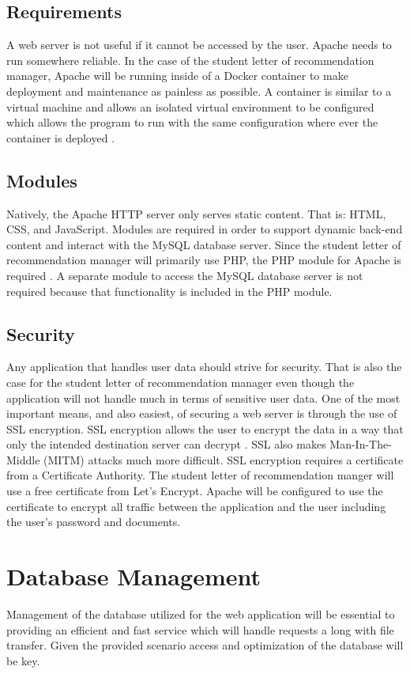 \documentclass[onecolumn, draftclsnofoot,10pt, compsoc]{IEEEtran}
\begin{document}
\subsection{Requirements}
A web server is not useful if it cannot be accessed by the user. Apache needs to run somewhere reliable. In the case of the student letter of recommendation manager, Apache will be running inside of a Docker container to make deployment and maintenance as painless as possible. A container is similar to a virtual machine and allows an isolated virtual environment to be configured which allows the program to run with the same configuration where ever the container is deployed \cite{docker}.

\subsection{Modules}
Natively, the Apache HTTP server only serves static content. That is: HTML, CSS, and JavaScript. Modules are required in order to support dynamic back-end content and interact with the MySQL database server. Since the student letter of recommendation manager will primarily use PHP, the PHP module for Apache is required \cite{apachephp}. A separate module to access the MySQL database server is not required because that functionality is included in the PHP module.

\subsection{Security}
Any application that handles user data should strive for security. That is also the case for the student letter of recommendation manager even though the application will not handle much in terms of sensitive user data. One of the most important means, and also easiest, of securing a web server is through the use of SSL encryption. SSL encryption allows the user to encrypt the data in a way that only the intended destination server can decrypt \cite{letsencrypt}. SSL also makes Man-In-The-Middle (MITM) attacks much more difficult. SSL encryption requires a certificate from a Certificate Authority. The student letter of recommendation manger will use a free certificate from Let's Encrypt. Apache will be configured to use the certificate to encrypt all traffic between the application and the user including the user's password and documents.


\section{Database Management}
Management of the database utilized for the web application will be essential to providing an efficient and fast service which will handle requests a long with file transfer. Given the provided scenario access and optimization of the database will be key. 
\end{document}
